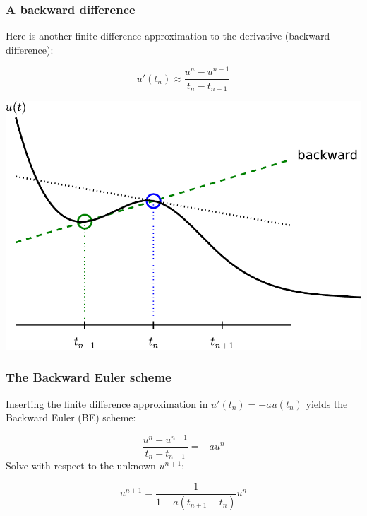 \documentclass{beamer}
\begin{document}
\begin{frame}
\frametitle{A backward difference}

Here is another finite difference approximation to the
derivative (backward difference):

\begin{equation}
u'(t_n) \approx \frac{u^{n}-u^{n-1}}{t_{n}-t_{n-1}}
\label{decay:BEdiff}
\end{equation}



\centerline{\includegraphics[width=0.8\linewidth]{fig-alg/fd_backward.pdf}}
\end{frame}

\begin{frame}
\frametitle{The Backward Euler scheme}


Inserting the finite difference approximation in $u'(t_n)=-au(t_n)$ yields
the Backward Euler (BE) scheme:

\begin{equation}
\frac{u^{n}-u^{n-1}}{t_{n}-t_{n-1}} = -a u^n
\label{decay:BE0}
\end{equation}
Solve with respect to the unknown $u^{n+1}$:

\begin{equation}
u^{n+1} = \frac{1}{1+ a(t_{n+1}-t_n)} u^n
\label{decay:BE}
\end{equation}
\end{frame}
\end{document}
